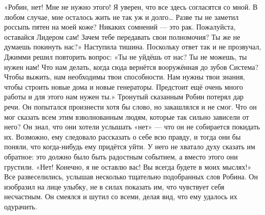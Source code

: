 \documentclass[a4paper,12pt]{book}
\begin{document}
	«Робин, нет! Мне не нужно этого! Я уверен, что все здесь согласятся со мной. В любом случае, мне осталось жить не так уж и долго… Разве ты не заметил россыпь пятен на моей коже? Никаких сомнений — это рак. Пожалуйста, оставайся Лидером сам! Зачем тебе передавать свои полномочия? Ты же не думаешь покинуть нас?»
	Наступила тишина. Поскольку ответ так и не прозвучал, Джимми решил повторить вопрос:
	«Ты не уйдёшь от нас? Ты не можешь, ты нужен нам! Что нам делать, когда сюда вернётся вооружённая до зубов Система? Чтобы выжить, нам необходимы твои способности. Нам нужны твои знания, чтобы строить новые дома и новые генераторы. Предстоит ещё очень много работы и для этого нам нужен ты.»
	Тронутый сказанным Робин потерял дар речи. Он попытался произнести хотя бы слово, но закашлялся и не смог. Что он мог сказать всем этим взволнованным людям, которые так сильно зависели от него? Он знал, что они хотели услышать «нет» — что он не собирается покидать их. Возможно, ему следовало рассказать о себе всю правду, и тогда они бы поняли, что когда-нибудь ему придётся уйти. У него не хватало духу сказать им обратное: это должно было быть радостным событием, а вместо этого они грустили.
	«Нет! Конечно, я не оставлю вас! Вы всегда будете в моих мыслях!»
	Все развеселились, услышав несколько тщательно подобранных слов Робина. Он изобразил на лице улыбку, не в силах показать им, что чувствует себя несчастным. Он смеялся и шутил со всеми, делая вид, что ему удалось их одурачить.
\end{document}
